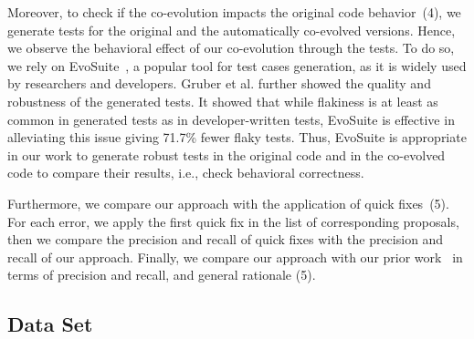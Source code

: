 	Moreover, to check if the co-evolution impacts the original code behavior~(4), we generate tests for the original and the automatically co-evolved versions. Hence, we observe the behavioral effect of our co-evolution through the tests. To do so, we rely on EvoSuite~\cite{fraser2011evosuite}, a popular tool for test cases generation, as it is widely used by researchers and developers. 
	Gruber et al. \cite{gruber2023automatic} further showed the quality and robustness of the generated tests. It showed that while flakiness is at least as common in generated tests as in developer-written tests, EvoSuite is effective in alleviating this issue giving 71.7\% fewer flaky tests. Thus, EvoSuite is appropriate in our work to generate robust tests in the original code and in the co-evolved code to compare their results, i.e., check behavioral correctness.
	
	Furthermore, we compare our approach with the application of quick fixes~(5). For each error, we apply the first quick fix in the list of corresponding proposals, then we compare the precision and recall of quick fixes with the precision and recall of our approach.
	Finally, we compare our approach with our prior work~\cite{Khelladi2020} in terms of precision and recall, and general rationale (5).
	
	
	
	
	
	






\subsection{Data Set}

